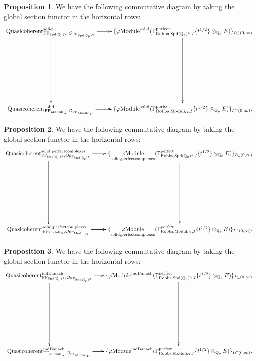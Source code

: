 \documentclass[12pt]{book}
\theoremstyle{definition}
\newtheorem{proposition}{Proposition}
\begin{document}
\begin{proposition}
We have the following commutative diagram by taking the global section functor in the horizontal rows:\\
\[\displayindent=+0in
\xymatrix@R+7pc{
\mathrm{Quasicoherent}^{\mathrm{solid}}_{\mathrm{FF}_{\mathrm{Spd}(\mathbb{Q}_p)^\diamond},\mathcal{O}_{\mathrm{FF}_{\mathrm{Spd}(\mathbb{Q}_p)^\diamond}}} \ar[r] \ar[d] &\{\varphi\mathrm{Module}^{\mathrm{solid}}(\Gamma^\text{perfect}_{\text{Robba},{\mathrm{Spd}(\mathbb{Q}_p)^\diamond},I}\{t^{1/2}\}\otimes_{\mathbb{Q}_p}E)\}_{I\subset (0,\infty)} \ar[d]\\
\mathrm{Quasicoherent}^{\mathrm{solid}}_{\mathrm{FF}_{\mathrm{Moduli}_G},\mathcal{O}_{\mathrm{FF}_{\mathrm{Moduli}_G}}}  \ar[r] \ar[r] \ar[r] &\{\varphi\mathrm{Module}^{\mathrm{solid}}(\Gamma^\text{perfect}_{\text{Robba},{\mathrm{Moduli}_G},I}\{t^{1/2}\}\otimes_{\mathbb{Q}_p}E)\}_{I\subset (0,\infty)}.  \\  
}
\]
\end{proposition}

\begin{proposition}
We have the following commutative diagram by taking the global section functor in the horizontal rows:\\
\[\displayindent=+0in
\xymatrix@R+7pc{
\mathrm{Quasicoherent}^{\mathrm{solid,perfectcomplexes}}_{\mathrm{FF}_{\mathrm{Spd}(\mathbb{Q}_p)^\diamond},\mathcal{O}_{\mathrm{FF}_{\mathrm{Spd}(\mathbb{Q}_p)^\diamond}}} \ar[r] \ar[d] &\{\underset{\mathrm{solid,perfectcomplexes}}{\varphi\mathrm{Module}}(\Gamma^\text{perfect}_{\text{Robba},{\mathrm{Spd}(\mathbb{Q}_p)^\diamond},I}\{t^{1/2}\}\otimes_{\mathbb{Q}_p}E)\}_{I\subset (0,\infty)} \ar[d]  \\
\mathrm{Quasicoherent}^{\mathrm{solid,perfectcomplexes}}_{\mathrm{FF}_{\mathrm{Moduli}_G},\mathcal{O}_{\mathrm{FF}_{\mathrm{Moduli}_G}}}  \ar[r] \ar[r] \ar[r] &\{\underset{\mathrm{solid,perfectcomplexes}}{\varphi\mathrm{Module}}(\Gamma^\text{perfect}_{\text{Robba},{\mathrm{Moduli}_G},I}\{t^{1/2}\}\otimes_{\mathbb{Q}_p}E)\}_{I\subset (0,\infty)}.   
}
\]
\end{proposition}

\begin{proposition}
We have the following commutative diagram by taking the global section functor in the horizontal rows:\\
\[\displayindent=+0in
\xymatrix@C-0.1in@R+7pc{
\mathrm{Quasicoherent}^{\mathrm{indBanach}}_{\mathrm{FF}_{\mathrm{Spd}(\mathbb{Q}_p)^\diamond},\mathcal{O}_{\mathrm{FF}_{\mathrm{Spd}(\mathbb{Q}_p)^\diamond}}} \ar[r] \ar[d] &\{\varphi\mathrm{Module}^\text{indBanach}(\Gamma^\text{perfect}_{\text{Robba},{\mathrm{Spd}(\mathbb{Q}_p)^\diamond},I}\{t^{1/2}\}\otimes_{\mathbb{Q}_p}E)\}_{I\subset (0,\infty)}\ar[d]\\
\mathrm{Quasicoherent}^{\mathrm{indBanach}}_{\mathrm{FF}_{\mathrm{Moduli}_G},\mathcal{O}_{\mathrm{FF}_{\mathrm{Moduli}_G}}}  \ar[r] \ar[r] \ar[r] &\{\varphi\mathrm{Module}^{\mathrm{indBanach}}(\Gamma^\text{perfect}_{\text{Robba},{\mathrm{Moduli}_G},I}\{t^{1/2}\}\otimes_{\mathbb{Q}_p}E)\}_{I\subset (0,\infty)}.    
}
\]
\end{proposition}
\end{document}
